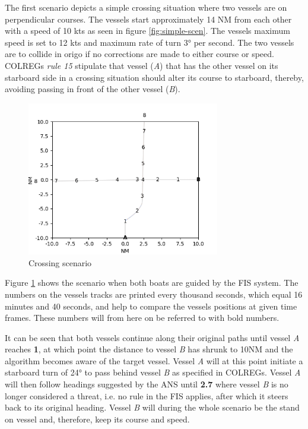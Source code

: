 The first scenario depicts a simple crossing situation where two vessels are on perpendicular courses. The vessels start  approximately 14 NM from each other with a speed of 10 kts as seen in figure \ref{fig:simple-scen}. The vessels maximum speed is set to 12 kts and maximum rate of turn \ang{3} per second. The two vessels are to  collide in origo if no corrections are made to either course or speed. COLREGs \textit{rule 15} stipulate that vessel (\textit{A}) that has the other vessel on its starboard side  in a crossing situation should alter its course to starboard, thereby, avoiding passing in front of the other vessel (\textit{B}).
\begin{figure}[H]
    \centering
    \includegraphics[width=0.75\textwidth,height=0.75\textheight,keepaspectratio]{../src/img/crossing_res.png}
    \caption{Crossing scenario}
    \label{fig:simple-scen-res}
\end{figure}

Figure \ref{fig:simple-scen-res} shows the scenario when both boats are guided by the FIS system. The numbers on the vessels tracks are printed every thousand seconds, which equal 16 minutes and 40 seconds, and help to compare the vessels positions at  given time frames. These numbers will from here on be referred to with bold numbers.

It can be seen that both vessels continue along their original paths until vessel \textit{A} reaches \textbf{1}, at which point the distance to vessel \textit{B} has shrunk to 10NM and the algorithm becomes aware of the target vessel. Vessel \textit{A} will at this point initiate a starboard turn  of \ang{24}  to pass behind vessel \textit{B} as specified in COLREGs. Vessel \textit{A} will then follow headings suggested by the ANS until \textbf{2.7} where  vessel \textit{B} is no longer considered a threat, i.e. no rule in the FIS applies, after which it steers back to its original heading. Vessel \textit{B} will during the whole scenario be the stand on vessel and, therefore, keep its course and speed.

